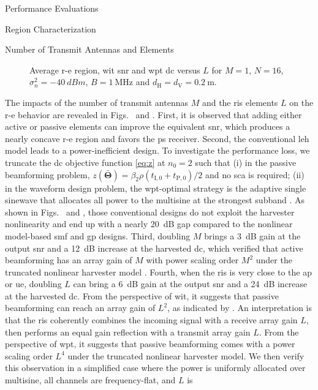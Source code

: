 \begin{section}{Performance Evaluations}
\begin{subsection}{ Region Characterization}
\begin{subsubsection}{Number of Transmit Antennas and  Elements}
			\begin{figure}[H]
				\centering
				\caption{Average \gls{r-e} region, \gls{wit} \gls{snr} and \gls{wpt} \gls{dc} versus $L$ for $M=1$, $N=16$, $\sigma_n^2=\qty{-40}{dBm}$, $B=\qty{1}{\MHz}$ and $d_{\mathrm{H}}=d_{\mathrm{V}}=\qty{0.2}{\meter}$.}
			\end{figure}

			The impacts of the number of transmit antennas $M$ and the \gls{ris} elements $L$ on the \gls{r-e} behavior are revealed in Figs.~ and . First, it is observed that adding either active or passive elements can improve the equivalent \gls{snr}, which produces a nearly concave \gls{r-e} region and favors the \gls{ps} receiver. Second, the conventional \gls{leh} model leads to a power-inefficient design. To investigate the performance loss, we truncate the \gls{dc} objective function \eqref{eq:z} at $n_0=2$ such that (i) in the passive beamforming problem, $z(\bar{\mathbf{\Theta}}) = {\beta_2}{\rho}(t_{\mathrm{I},0}+t_{\mathrm{P},0})/2$ and no \gls{sca} is required; (ii) in the waveform design problem, the \gls{wpt}-optimal strategy is the adaptive single sinewave that allocates all power to the multisine at the strongest subband \cite{Clerckx2016a}. As shown in Figs.~ and , those conventional designs do not exploit the harvester nonlinearity and end up with a nearly \qty{20}{dB} gap compared to the nonlinear model-based \gls{smf} and \gls{gp} designs. Third, doubling $M$ brings a \qty{3}{\dB} gain at the output \gls{snr} and a \qty{12}{dB} increase at the harvested \gls{dc}, which verified that active beamforming has an array gain of $M$ \cite{Tse2005} with power scaling order $M^2$ under the truncated nonlinear harvester model \cite{Clerckx2016a,Clerckx2018b}. Fourth, when the \gls{ris} is very close to the \gls{ap} or \gls{ue}, doubling $L$ can bring a \qty{6}{\dB} gain at the output \gls{snr} and a \qty{24}{dB} increase at the harvested \gls{dc}. From the perspective of \gls{wit}, it suggests that passive beamforming can reach an array gain of $L^2$, as indicated by \cite{Wu2019}. An interpretation is that the \gls{ris} coherently combines the incoming signal with a receive array gain $L$, then performs an equal gain reflection with a transmit array gain $L$. From the perspective of \gls{wpt}, it suggests that passive beamforming comes with a power scaling order $L^4$ under the truncated nonlinear harvester model. We then verify this observation in a simplified case where the power is uniformly allocated over multisine, all channels are frequency-flat, and $L$ is 
\end{subsubsection}
\end{subsection}
\end{section}
